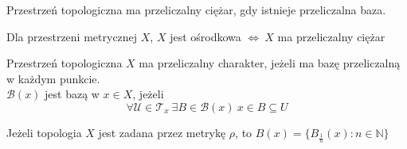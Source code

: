 \begin{df} Przestrzeń topologiczna ma przeliczalny ciężar, gdy istnieje przeliczalna baza. \end{df} 
\begin{przyp} Dla przestrzeni metrycznej $X$, $X$ jest ośrodkowa $\Leftrightarrow \ X$ ma przeliczalny ciężar
\end{przyp}
\begin{df} 
    Przestrzeń topologiczna $X$ ma przeliczalny charakter, jeżeli ma bazę przeliczalną w każdym punkcie. \\[5mm]
    $\mathcal B(x)$ jest bazą w $x \in X$, jeżeli 
    \[ \forall \mathcal U \in \mathcal T_x \ \exists B \in \mathcal B(x) \ x \in B \subseteq U \]
\end{df} 
\begin{uw} Jeżeli topologia $X$ jest zadana przez metrykę $\rho$, to $B(x) = \{ B_{\frac{1}{n}} (x): n \in \mathbb N \}$ \end{uw} 
